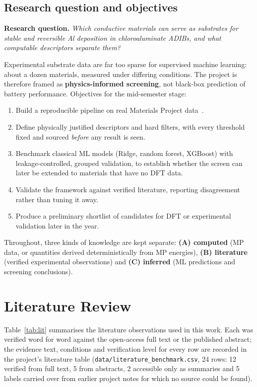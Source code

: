 \subsection{Research question and objectives}
\noindent\textbf{Research question.} \emph{Which conductive materials can serve as substrates for stable and reversible Al deposition in chloroaluminate ADIBs, and what computable descriptors separate them?}

\noindent Experimental substrate data are far too sparse for supervised machine learning: about a dozen materials, measured under differing conditions. The project is therefore framed as \textbf{physics-informed screening}, not black-box prediction of battery performance. Objectives for the mid-semester stage:
\begin{enumerate}[leftmargin=*,itemsep=2pt]
\item Build a reproducible pipeline on real Materials Project data~\citep{Jain2013}.
\item Define physically justified descriptors and hard filters, with every threshold fixed and sourced \emph{before} any result is seen.
\item Benchmark classical ML models (Ridge, random forest, XGBoost) with leakage-controlled, grouped validation, to establish whether the screen can later be extended to materials that have no DFT data.
\item Validate the framework against verified literature, reporting disagreement rather than tuning it away.
\item Produce a preliminary shortlist of candidates for DFT or experimental validation later in the year.
\end{enumerate}

\noindent Throughout, three kinds of knowledge are kept separate: \textbf{(A) computed} (MP data, or quantities derived deterministically from MP energies), \textbf{(B) literature} (verified experimental observations) and \textbf{(C) inferred} (ML predictions and screening conclusions).

\section{Literature Review}
\label{sec:lit}

Table~\ref{tab:lit} summarises the literature observations used in this work. Each was verified word for word against the open-access full text or the published abstract; the evidence text, conditions and verification level for every row are recorded in the project's literature table (\texttt{data/literature\_benchmark.csv}, 24 rows: 12 verified from full text, 5 from abstracts, 2 accessible only as summaries and 5 labels carried over from earlier project notes for which no source could be found).

